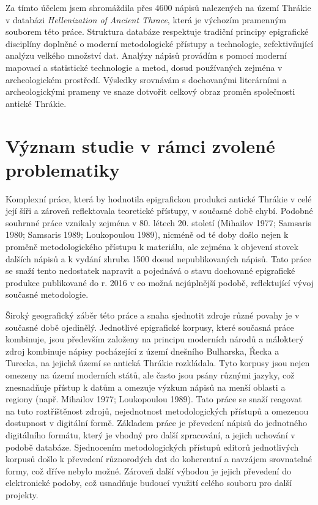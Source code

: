 Za tímto účelem jsem shromáždila přes 4600 nápisů nalezených na území Thrákie v databázi {\em Hellenization of Ancient Thrace}, která je výchozím pramenným souborem této práce. Struktura databáze respektuje tradiční principy epigrafické disciplíny doplněné o moderní metodologické přístupy a technologie, zefektivňující analýzu velkého množství dat. Analýzy nápisů provádím s pomocí moderní mapovací a statistické technologie a metod, dosud používaných zejména v archeologickém prostředí. Výsledky srovnávám s dochovanými literárními a archeologickými prameny ve snaze dotvořit celkový obraz proměn společnosti antické Thrákie.

\section[význam-studie-v-rámci-zvolené-problematiky]{Význam studie v rámci zvolené problematiky}

Komplexní práce, která by hodnotila epigrafickou produkci antické Thrákie v celé její šíři a zároveň reflektovala teoretické přístupy, v současné době chybí. Podobné souhrnné práce vznikaly zejména v 80. létech 20. století (Mihailov 1977; Samsaris 1980; Samsaris 1989; Loukopoulou 1989), nicméně od té doby došlo nejen k proměně metodologického přístupu k materiálu, ale zejména k objevení stovek dalších nápisů a k vydání zhruba 1500 dosud nepublikovaných nápisů. Tato práce se snaží tento nedostatek napravit a pojednává o stavu dochované epigrafické produkce publikované do r. 2016 v co možná nejúplnější podobě, reflektující vývoj současné metodologie.

Široký geografický záběr této práce a snaha sjednotit zdroje různé povahy je v současné době ojedinělý. Jednotlivé epigrafické korpusy, které současná práce kombinuje, jsou především založeny na principu moderních národů a málokterý zdroj kombinuje nápisy pocházející z území dnešního Bulharska, Řecka a Turecka, na jejichž území se antická Thrákie rozkládala. Tyto korpusy jsou nejen omezeny na území moderních států, ale často jsou psány různými jazyky, což znesnadňuje přístup k datům a omezuje výzkum nápisů na menší oblasti a regiony (např. Mihailov 1977; Loukopoulou 1989). Tato práce se snaží reagovat na tuto roztříštěnost zdrojů, nejednotnost metodologických přístupů a omezenou dostupnost v digitální formě. Základem práce je převedení nápisů do jednotného digitálního formátu, který je vhodný pro další zpracování, a jejich uchování v podobě databáze. Sjednocením metodologických přístupů editorů jednotlivých korpusů došlo k převedení různorodých dat do koherentní a navzájem srovnatelné formy, což dříve nebylo možné. Zároveň další výhodou je jejich převedení do elektronické podoby, což usnadňuje budoucí využití celého souboru pro další projekty.

